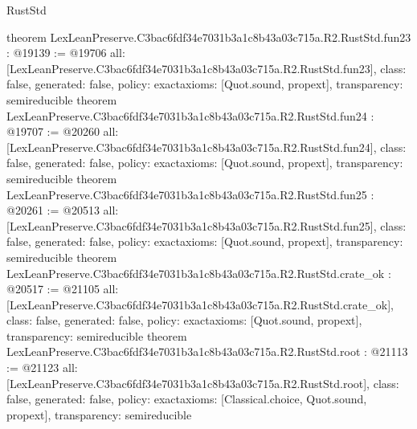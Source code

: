 \begin{lexlean}{RustStd}
\begin{coremodule}
{}
theorem LexLeanPreserve.C3bac6fdf34e7031b3a1c8b43a03c715a.R2.RustStd.fun23 : @19139 := @19706 {
  all: [LexLeanPreserve.C3bac6fdf34e7031b3a1c8b43a03c715a.R2.RustStd.fun23],
  class: false,
  generated: false,
  policy: exact{axioms: [Quot.sound, propext]},
  transparency: semireducible
}
theorem LexLeanPreserve.C3bac6fdf34e7031b3a1c8b43a03c715a.R2.RustStd.fun24 : @19707 := @20260 {
  all: [LexLeanPreserve.C3bac6fdf34e7031b3a1c8b43a03c715a.R2.RustStd.fun24],
  class: false,
  generated: false,
  policy: exact{axioms: [Quot.sound, propext]},
  transparency: semireducible
}
theorem LexLeanPreserve.C3bac6fdf34e7031b3a1c8b43a03c715a.R2.RustStd.fun25 : @20261 := @20513 {
  all: [LexLeanPreserve.C3bac6fdf34e7031b3a1c8b43a03c715a.R2.RustStd.fun25],
  class: false,
  generated: false,
  policy: exact{axioms: [Quot.sound, propext]},
  transparency: semireducible
}
theorem LexLeanPreserve.C3bac6fdf34e7031b3a1c8b43a03c715a.R2.RustStd.crate_ok : @20517 := @21105 {
  all: [LexLeanPreserve.C3bac6fdf34e7031b3a1c8b43a03c715a.R2.RustStd.crate_ok],
  class: false,
  generated: false,
  policy: exact{axioms: [Quot.sound, propext]},
  transparency: semireducible
}
theorem LexLeanPreserve.C3bac6fdf34e7031b3a1c8b43a03c715a.R2.RustStd.root : @21113 := @21123 {
  all: [LexLeanPreserve.C3bac6fdf34e7031b3a1c8b43a03c715a.R2.RustStd.root],
  class: false,
  generated: false,
  policy: exact{axioms: [Classical.choice, Quot.sound, propext]},
  transparency: semireducible
}


\end{coremodule}
\end{lexlean}
